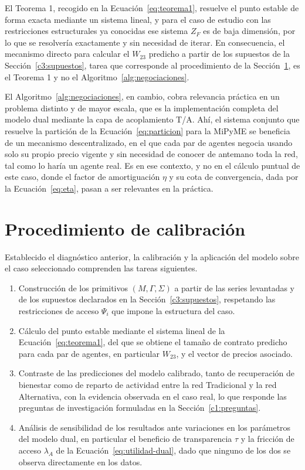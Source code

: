 El Teorema 1, recogido en la Ecuación~\eqref{eq:teorema1}, resuelve el punto estable de forma exacta mediante un sistema lineal, y para el caso de estudio con las restricciones estructurales ya conocidas ese sistema $Z_F$ es de baja dimensión, por lo que se resolvería exactamente y sin necesidad de iterar. En consecuencia, el mecanismo directo para calcular el $W_{23}$ predicho a partir de los supuestos de la Sección~\ref{c3:supuestos}, tarea que corresponde al procedimiento de la Sección~\ref{c3:calibracion}, es el Teorema 1 y no el Algoritmo~\ref{alg:negociaciones}.

El Algoritmo~\ref{alg:negociaciones}, en cambio, cobra relevancia práctica en un problema distinto y de mayor escala, que es la implementación completa del modelo dual mediante la capa de acoplamiento T/A. Ahí, el sistema conjunto que resuelve la partición de la Ecuación~\eqref{eq:particion} para la MiPyME se beneficia de un mecanismo descentralizado, en el que cada par de agentes negocia usando solo su propio precio vigente y sin necesidad de conocer de antemano toda la red, tal como lo haría un agente real. Es en ese contexto, y no en el cálculo puntual de este caso, donde el factor de amortiguación $\eta$ y su cota de convergencia, dada por la Ecuación~\eqref{eq:eta}, pasan a ser relevantes en la práctica.

\section{Procedimiento de calibración}
\label{c3:calibracion}

Establecido el diagnóstico anterior, la calibración y la aplicación del modelo
sobre el caso seleccionado comprenden las tareas siguientes.

\begin{enumerate}
    \item Construcción de los primitivos $(M,\Gamma,\Sigma)$ a partir de las
    series levantadas y de los supuestos declarados en la
    Sección~\ref{c3:supuestos}, respetando las restricciones de acceso
    $\Psi_i$ que impone la estructura del caso.
    \item Cálculo del punto estable mediante el sistema lineal de la
    Ecuación~\eqref{eq:teorema1}, del que se obtiene el tamaño de contrato
    predicho para cada par de agentes, en particular $W_{23}$, y el vector de
    precios asociado.
    \item Contraste de las predicciones del modelo calibrado, tanto de
    recuperación de bienestar como de reparto de actividad entre la red
    Tradicional y la red Alternativa, con la evidencia observada en el caso
    real, lo que responde las preguntas de investigación formuladas en la
    Sección~\ref{c1:preguntas}.
    \item Análisis de sensibilidad de los resultados ante variaciones en los
    parámetros del modelo dual, en particular el beneficio de transparencia
    $\tau$ y la fricción de acceso $\lambda_A$ de la
    Ecuación~\eqref{eq:utilidad-dual}, dado que ninguno de los dos se observa
    directamente en los datos.
\end{enumerate}

